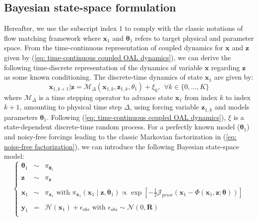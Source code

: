\documentclass[10pt]{article}
\begin{document}
\subsection{Bayesian state-space formulation}

Hereafter, we use the subscript index $1$ to comply with the classic notations of flow matching framework \cite{lipman_flow_2023,albergo_stochastic_2025} where $\mathbf{x}_1$ and $\mathbf{\theta}_1$ refers to target physical and parameter space. 
From the time-continuous representation of coupled dynamics for $\mathbf{x}$ and $\mathbf{z}$ given by (\ref{eq: time-continuous coupled OAL dynamics}), we can derive the following time-discrete representation of the dynamics of variable $\mathbf{x}$ regarding  $\mathbf{z}$ as some known conditioning.  The discrete-time dynamics of state $\mathbf{x}_1$ are given by:
\begin{equation}
    \label{eq: discrete-time dynamical model}
        \mathbf{x}_{1,k+1} | \mathbf{z} = \mathcal{M}_{\Delta} \left ( \mathbf{x}_{1,k} , \mathbf{z}_{1,k}, \theta_1 \right ) + \xi _{k}, \ \ \forall k \in \{0,\ldots,K\}
\end{equation}
where $\mathcal{M}_{\Delta}$ is a time stepping operator to advance state $\mathbf{x}_{1}$ from index $k$ to index $k+1$, amounting to physical time step $\Delta$, using  forcing variable $\mathbf{z}_{1,k}$ and models parameters $\mathbf{\theta}_1$. Following (\ref{eq: time-continuous coupled OAL dynamics}), $\xi$ is a state-dependent discrete-time random process. For a perfectly known model ($\mathbf{\theta}_1$) and noisy-free forcings leading to the classic Markovian factorization in (\ref{eq: noise-free factorization}), we can introduce the following Bayesian state-space model:
\begin{equation}
    \label{eq: Bayesian state space}
    \left \{\begin{array}{ccl}
        \mathbf{\theta}_1 &\sim& \pi_{\mathbf{\theta}_1}\\~\\
        \mathbf{z} &\sim& \pi_{\mathbf{z}}\\~\\
        \mathbf{x}_1 &\sim& \pi_{\mathbf{x}_1} \mbox{ with } \pi_{\mathbf{x}_1} \left( \mathbf{x}_1\mid \mathbf{z} , \mathbf{\theta}_1 \right ) \propto \exp \left [ - \frac{1}{2}\mathcal{J}_{prior} \left ( \mathbf{x}_1 - \Phi \left (  \mathbf{x}_1 , \mathbf{z} ; \mathbf{\theta} \right ) \right ) \right ]\\~\\
        \mathbf{y}_1  &=& \mathcal{H}\left ( \mathbf{x}_1 \right ) + \epsilon_{obs} \mbox{ with } \epsilon_{obs} \sim \mathcal{N}\left ( 0, \mathbf{R} \right ) \\
    \end{array} \right.
\end{equation}
\end{document}
